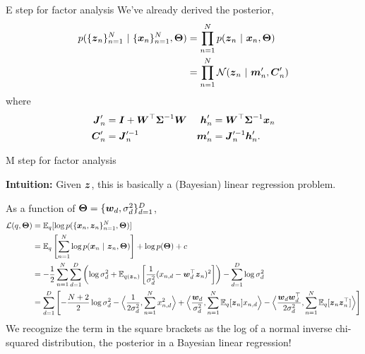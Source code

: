 \documentclass[aspectratio=169]{beamer}
\begin{document}
\begin{frame}{E step for factor analysis}
We've already derived the posterior,
\begin{align}
    p(\{\boldsymbol{z}_n\}_{n=1}^N ~\vert~ \{\boldsymbol{x}_n\}_{n=1}^N, \boldsymbol{\Theta})
    &= \prod_{n=1}^N p(\boldsymbol{z}_n ~\vert~ \boldsymbol{x}_n, \boldsymbol{\Theta}) \\
    &= \prod_{n=1}^N \mathcal{N}(\boldsymbol{z}_n ~\vert~ \boldsymbol{m}_n', \boldsymbol{C}_n') 
\end{align}
where
\begin{align}
    \boldsymbol{J}_n' &= \boldsymbol{I} + \boldsymbol{W}^\top \boldsymbol{\Sigma}^{-1} \boldsymbol{W} &
    \boldsymbol{h}_n' &= \boldsymbol{W}^\top \boldsymbol{\Sigma}^{-1} \boldsymbol{x}_n \\
    \boldsymbol{C}_n' &= \boldsymbol{J}_n'^{-1} & \boldsymbol{m}_n' &= \boldsymbol{J}_n'^{-1} \boldsymbol{h}_n'.
\end{align}
\end{frame}

\begin{frame}{M step for factor analysis}

\textbf{Intuition: } Given $\boldsymbol{z}$, this is basically a (Bayesian) linear regression problem.

As a function of $\boldsymbol{\Theta} = \{\boldsymbol{w}_d, \sigma_d^2\}_{d=1}^D$,
\begin{align}
    \mathcal{L}(q, \boldsymbol{\Theta}) &= \mathbb{E}_q[\log p(\{\boldsymbol{x}_n, \boldsymbol{z}_n\}_{n=1}^N, \boldsymbol{\Theta})] \\
    &= \mathbb{E}_q \left[\sum_{n=1}^N \log p(\boldsymbol{x}_n ~\vert~ \boldsymbol{z}_n, \boldsymbol{\Theta}) \right] + \log p(\boldsymbol{\Theta}) + c\\
    &= -\frac{1}{2}\sum_{n=1}^N \sum_{d=1}^D \left( \log \sigma_d^2 + \mathbb{E}_{q(\boldsymbol{z}_n)}\left[\frac{1}{\sigma_d^2} (x_{n,d} - \boldsymbol{w}_d^\top \boldsymbol{z}_n)^2 \right]  \right) - \sum_{d=1}^D \log \sigma_d^2 \\\
    &= \sum_{d=1}^D \left[ -\frac{N+2}{2} \log \sigma_d^2  
    - \Big \langle \frac{1}{2 \sigma_d^2}, \sum_{n=1}^N x_{n,d}^2 \Big \rangle
    + \Big \langle \frac{\boldsymbol{w}_d}{\sigma_d^2}, \sum_{n=1}^N \mathbb{E}_q[\boldsymbol{z}_n] x_{n,d} \Big \rangle
    - \Big \langle \frac{\boldsymbol{w}_d \boldsymbol{w}_d^\top}{2\sigma_d^2}, \sum_{n=1}^N \mathbb{E}_q[\boldsymbol{z}_n \boldsymbol{z}_n^\top] \Big \rangle \right] 
\end{align}
We recognize the term in the square brackets as the log of a normal inverse chi-squared distribution, the posterior in a Bayesian linear regression!
\end{frame}
\end{document}

